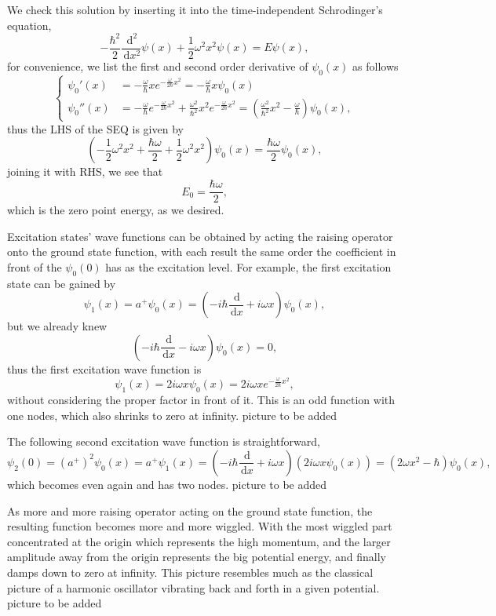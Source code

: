 \documentclass{article}
\newcommand{\be}{\begin{equation}}
\newcommand{\ee}{\end{equation}}
\newcommand{\dif}{\,\mathrm{d}}
\renewcommand{\1}{\left}
\renewcommand{\2}{\right}
\newcommand{\om}{\omega}
\begin{document}
We check this solution by inserting it into the time-independent Schrodinger's equation,
\be
-\frac{\hbar^2}{2}\frac{\dif^2}{\dif x^2} \psi(x) +\frac 1 2 \om^2 x^2 \psi(x)= E\psi(x),
\ee
for convenience, we list the first and second order derivative of $\psi_0(x)$ as follows
\be\1\{\begin{split}
\psi_0'(x)&=-\frac\om\hbar x e^{-\frac\om{2\hbar} x^2}=-\frac\om\hbar x \psi_0(x)\\
\psi_0''(x)&=-\frac\om\hbar e^{-\frac\om{2\hbar} x^2}+\frac{\om^2}{\hbar^2} x^2 e^{-\frac\om{2\hbar} x^2}=\1(\frac{\om^2}{\hbar^2} x^2-\frac\om\hbar\2)\psi_0(x),
\end{split}\2.\ee
thus the LHS of the SEQ is given by
\be
\1(-\frac 1 2 \om^2 x^2+\frac{\hbar\om}{2}+\frac 1 2 \om^2 x^2\2)\psi_0(x)=\frac{\hbar\om}{2}\psi_0(x),
\ee
joining it with RHS, we see that
\be
E_0=\frac{\hbar\om}{2},
\ee
which is the zero point energy, as we desired.

Excitation states' wave functions can be obtained by acting the raising operator onto the ground state function, with each result the same order the coefficient in front of the $\psi_0(0)$ has as the excitation level. For example, the first excitation state can be gained by
\be
\psi_1(x)=a^+\psi_0(x)=\1(-i\hbar\frac{\dif}{\dif x}+i\om x\2)\psi_0(x),
\ee
but we already knew
\be
\1(-i\hbar\frac{\dif}{\dif x}-i\om x\2)\psi_0(x)=0,
\ee
thus the first excitation wave function is
\be
\psi_1(x)=2i\om x\psi_0(x)=2i\om xe^{-\frac\om{2\hbar} x^2},
\ee
without considering the proper factor in front of it. This is an odd function with one nodes, which also shrinks to zero at infinity. picture to be added

The following second excitation wave function is straightforward, 
\be
\psi_2(0)=(a^+)^2\psi_0(x)=a^+\psi_1(x)=\1(-i\hbar\frac{\dif}{\dif x}+i\om x\2)(2i\om x\psi_0(x))=(2\om x^2-\hbar)\psi_0(x),
\ee
which becomes even again and has two nodes. picture to be added

As more and more raising operator acting on the ground state function, the resulting function becomes more and more wiggled. With the most wiggled part concentrated at the origin which represents the high momentum, and the larger amplitude away from the origin represents the big potential energy, and finally damps down to zero at infinity. This picture resembles much as the classical picture of a harmonic oscillator vibrating back and forth in a given potential.  picture to be added
\end{document}

